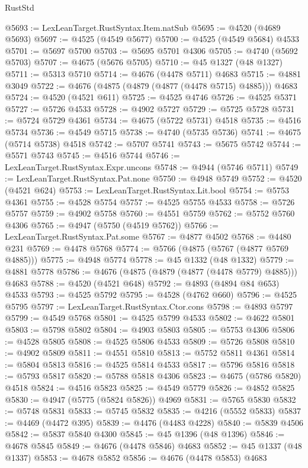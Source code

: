 \begin{lexlean}{RustStd}
\begin{coremodule}
@5693 := LexLeanTarget.RustSyntax.Item.natSub
@5695 := @4520 (@4689 @5693)
@5697 := @4525 (@4549 @5677)
@5700 := @4525 (@4549 @5684) @4533
@5701 := @5697 @5700
@5703 := @5695 @5701 @4306
@5705 := @4740 (@5692 @5703)
@5707 := @4675 (@5676 @5705)
@5710 := @45 @1327 (@48 @1327)
@5711 := @5313 @5710
@5714 := @4676 (@4478 @5711) @4683
@5715 := @4881 @3049
@5722 := @4676 (@4875 (@4879 (@4877 (@4478 @5715) @4885))) @4683
@5724 := @4520 (@4521 @611)
@5725 := @4525 @4746
@5726 := @4525 @5371
@5727 := @5726 @4533
@5728 := @4902 @5727
@5729 := @5725 @5728
@5731 := @5724 @5729 @4361
@5734 := @4675 (@5722 @5731) @4518
@5735 := @4516 @5734
@5736 := @4549 @5715
@5738 := @4740 (@5735 @5736)
@5741 := @4675 (@5714 @5738) @4518
@5742 := @5707 @5741
@5743 := @5675 @5742
@5744 := @5571 @5743
@5745 := @4516 @5744
@5746 := LexLeanTarget.RustSyntax.Expr.uncons
@5748 := @4944 (@5746 @5711)
@5749 := LexLeanTarget.RustSyntax.Pat.none
@5750 := @4948 @5749
@5752 := @4520 (@4521 @624)
@5753 := LexLeanTarget.RustSyntax.Lit.bool
@5754 := @5753 @4361
@5755 := @4528 @5754
@5757 := @4525 @5755 @4533
@5758 := @5726 @5757
@5759 := @4902 @5758
@5760 := @4551 @5759
@5762 := @5752 @5760 @4306
@5765 := @4947 (@5750 (@4519 @5762))
@5766 := LexLeanTarget.RustSyntax.Pat.some
@5767 := @4877 @4502
@5768 := @4480 @231
@5769 := @4478 @5768
@5774 := @5766 (@4875 (@5767 (@4877 @5769 @4885)))
@5775 := @4948 @5774
@5778 := @45 @1332 (@48 @1332)
@5779 := @4881 @5778
@5786 := @4676 (@4875 (@4879 (@4877 (@4478 @5779) @4885))) @4683
@5788 := @4520 (@4521 @648)
@5792 := @4893 (@4894 @84 @653) @4533
@5793 := @4525 @5792
@5795 := @4528 (@4762 @660)
@5796 := @4525 @5795
@5797 := LexLeanTarget.RustSyntax.Ctor.cons
@5798 := @4893 @5797
@5799 := @4549 @5768
@5801 := @4525 @5799 @4533
@5802 := @4622 @5801
@5803 := @5798 @5802
@5804 := @4903 @5803
@5805 := @5753 @4306
@5806 := @4528 @5805
@5808 := @4525 @5806 @4533
@5809 := @5726 @5808
@5810 := @4902 @5809
@5811 := @4551 @5810
@5813 := @5752 @5811 @4361
@5814 := @5804 @5813
@5816 := @4525 @5814 @4533
@5817 := @5796 @5816
@5818 := @5793 @5817
@5820 := @5788 @5818 @4306
@5823 := @4675 (@5786 @5820) @4518
@5824 := @4516 @5823
@5825 := @4549 @5779
@5826 := @4852 @5825
@5830 := @4947 (@5775 (@5824 @5826)) @4969
@5831 := @5765 @5830
@5832 := @5748 @5831
@5833 := @5745 @5832
@5835 := @4216 (@5552 @5833)
@5837 := @4469 (@4472 @395)
@5839 := @4476 (@4483 @4228)
@5840 := @5839 @4506
@5842 := @5837 @5840 @4300
@5845 := @45 @1396 (@48 @1396)
@5846 := @4678 @5845
@5849 := @4676 (@4478 @5846) @4683
@5852 := @45 @1337 (@48 @1337)
@5853 := @4678 @5852
@5856 := @4676 (@4478 @5853) @4683

\end{coremodule}
\end{lexlean}
